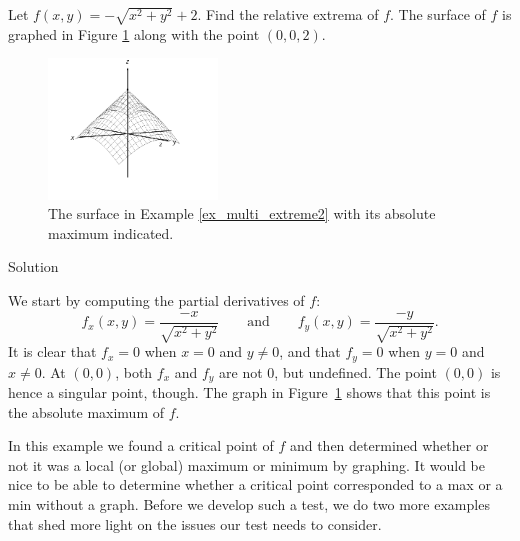 \begin{example}\label{ex_multi_extreme2}
Let $f(x,y) = -\sqrt{x^2+y^2}+2$. Find the relative extrema of $f$. The surface of $f$ is graphed in Figure \ref{fig_multi_var_24} along with the point $(0,0,2)$.

\begin{figure}[H]
	\begin{center}
			\includegraphics[width=0.4\textwidth]{fig_multi_var_24}
	\caption{The surface in Example \ref{ex_multi_extreme2} with its absolute maximum indicated.}
	\label{fig_multi_var_24}
	\end{center}
\end{figure}

Solution 

We start by computing the partial derivatives of $f$:
$$f_x(x,y) = \frac{-x}{\sqrt{x^2+y^2}}\qquad \text{and}\qquad f_y(x,y) = \frac{-y}{\sqrt{x^2+y^2}}.$$
It is clear that $f_x=0$ when $x=0$ and $y\neq0$, and that $f_y=0$ when $y=0$ and $x\neq0$. At $(0,0)$, both $f_x$ and $f_y$ are not $0$, but  undefined. The point $(0,0)$ is hence a singular point, though.  The graph in Figure~\ref{fig_multi_var_24} shows that this point is the absolute maximum of $f$.
\end{example}


In this example we found a critical point of $f$ and then determined whether or not it was a local (or global) maximum or minimum by graphing. It would be nice to be able to determine whether a critical point corresponded to a max or a min without a graph. Before we develop such a test, we do two more examples that shed more light on the issues our test needs to consider.

